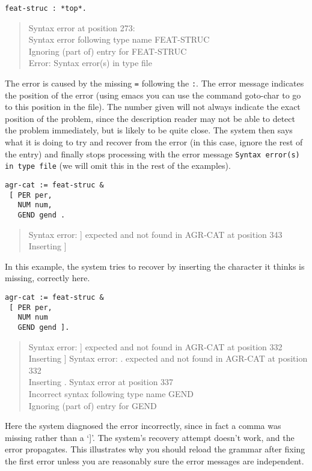 \documentclass[12pt]{report}
\newenvironment{error}%
{\begin{quote}
\tt
}%
{\end{quote}
}
\begin{document}
\begin{verbatim}
feat-struc : *top*.
\end{verbatim}
\begin{error}
Syntax error at position 273: \\
Syntax error following type name FEAT-STRUC\\
Ignoring (part of) entry for FEAT-STRUC\\
Error: Syntax error(s) in type file
\end{error}
The error is caused by the missing {\tt =} following the
{\tt :}.  The error message indicates the position of
the error (using emacs you can use the command goto-char to
go to this position in the file).  The number given will
not always indicate the exact position of the problem, since the description reader
may not be able to detect the problem immediately, but is likely to be quite close.  
The system then says what it is doing to try and recover from the error
(in this case, ignore the rest of the entry) and finally stops processing with
the error message {\tt Syntax error(s) in type file} (we will
omit this in the rest of the examples).

\begin{verbatim}
agr-cat := feat-struc &
 [ PER per,
   NUM num,
   GEND gend .
\end{verbatim}
\begin{error}
Syntax error: ] expected and not found in AGR-CAT at position 343\\
Inserting ]
\end{error}
In this example, the system tries to recover by inserting the character
it thinks is missing, correctly here.

\begin{verbatim}
agr-cat := feat-struc &
 [ PER per,
   NUM num
   GEND gend ]. 
\end{verbatim}
\begin{error}
Syntax error: ] expected and not found in AGR-CAT at position 332\\
Inserting ]
Syntax error: . expected and not found in AGR-CAT at position 332\\
Inserting .
Syntax error at position 337\\
Incorrect syntax following type name GEND\\
Ignoring (part of) entry for GEND
\end{error}
Here the system diagnosed the error incorrectly, since in fact
a comma was missing rather than a `]'.  
The system's recovery attempt doesn't work, and the error 
propagates.  This illustrates
why you should reload the grammar after fixing the first error
unless you are reasonably sure the error messages are independent.
\end{document}
